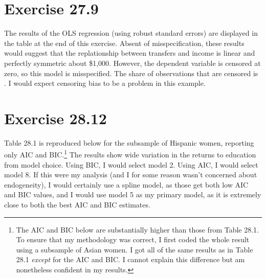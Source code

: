 \documentclass{article}
\begin{document}

\section*{Exercise 27.9}

The results of the OLS regression (using robust standard errors) are displayed in the table at the end of this exercise. Absent of misspecification, these results would suggest that the replationship between transfers and income is linear and perfectly symmetric about \$1,000. However, the dependent variable is censored at zero, so this model is misspecified. The share of observations that are censored is . I would expect censoring bias to be a problem in this example.

\begin{center}
	
\end{center}

\section*{Exercise 28.12}
Table 28.1 is reproduced below for the subsample of Hispanic women, reporting only AIC and BIC.\footnote{The AIC and BIC below are substantially higher than those from Table 28.1. To ensure that my methodology was correct, I first coded the whole result using a subsample of Asian women. I got all of the same results as in Table 28.1 \textit{except} for the AIC and BIC. I cannot explain this difference but am nonetheless confident in my results.} The results show wide variation in the returns to education from model choice. Using BIC, I would select model 2. Using AIC, I would select model 8. If this were my analysis (and I for some reason wasn't concerned about endogeneity), I would certainly use a spline model, as those get both low AIC and BIC values, and I would use model 5 as my primary model, as it is extremely close to both the best AIC and BIC estimates.

\begin{table}[ht]
\centering
\resizebox{\textwidth}{!}{}
\end{table} 

\end{document}
